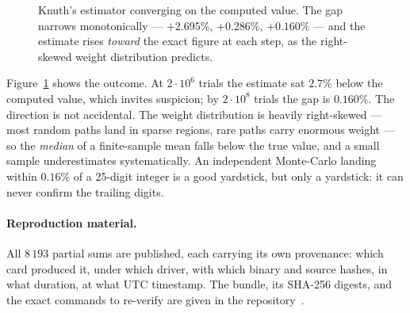 \documentclass[11pt,a4paper]{article}
\begin{document}
\begin{figure}[t]
\centering
{}
\caption{Knuth's estimator converging on the computed value. The gap narrows
monotonically --- $+2.695\%$, $+0.286\%$, $+0.160\%$ --- and the estimate rises
\emph{toward} the exact figure at each step, as the right-skewed weight
distribution predicts.}
\label{fig:estimator}
\end{figure}

Figure~\ref{fig:estimator} shows the outcome. At $2\cdot 10^6$ trials the
estimate sat $2.7\%$ below the computed value, which invites suspicion; by
$2 \cdot 10^8$ trials the gap is $0.160\%$. The direction is not accidental. The
weight distribution is heavily right-skewed --- most random paths land in sparse
regions, rare paths carry enormous weight --- so the \emph{median} of a
finite-sample mean falls below the true value, and a small sample
underestimates systematically. An independent Monte-Carlo landing within
$0.16\%$ of a 25-digit integer is a good yardstick, but only a yardstick: it can
never confirm the trailing digits.

\paragraph{Reproduction material.} All $8\,193$ partial sums are published, each
carrying its own provenance: which card produced it, under which driver, with
which binary and source hashes, in what duration, at what UTC timestamp. The
bundle, its SHA-256 digests, and the exact commands to re-verify are given in
the repository~\cite{repo}.
\end{document}
